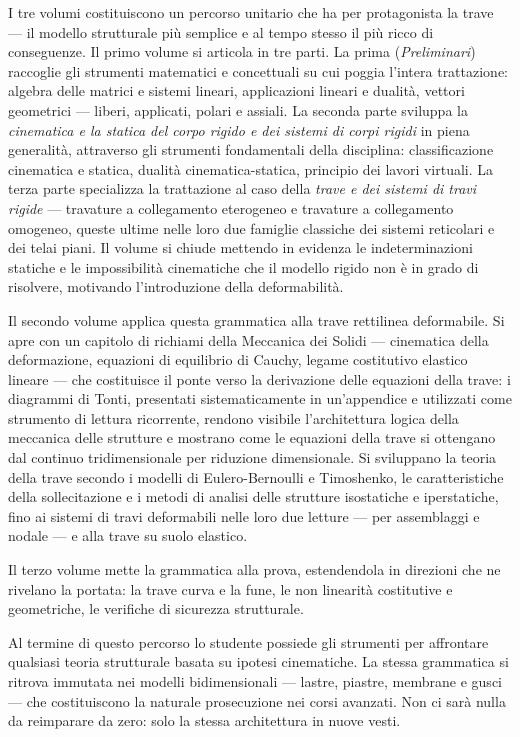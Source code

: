 I tre volumi costituiscono un percorso unitario che ha per
protagonista la trave --- il modello strutturale più
semplice e al tempo stesso il più ricco di conseguenze. Il
primo volume si articola in tre parti. La prima
(\emph{Preliminari}) raccoglie gli strumenti matematici e
concettuali su cui poggia l'intera trattazione: algebra
delle matrici e sistemi lineari, applicazioni lineari e
dualità, vettori geometrici --- liberi, applicati, polari e
assiali. La seconda parte sviluppa la \emph{cinematica e la
	statica del corpo rigido e dei sistemi di corpi rigidi} in
piena generalità, attraverso gli strumenti fondamentali
della disciplina: classificazione cinematica e statica,
dualità cinematica-statica, principio dei lavori virtuali.
La terza parte specializza la trattazione al caso della
\emph{trave e dei sistemi di travi rigide} --- travature a
collegamento eterogeneo e travature a collegamento omogeneo,
queste ultime nelle loro due famiglie classiche dei sistemi
reticolari e dei telai piani. Il volume si chiude mettendo
in evidenza le indeterminazioni statiche e le impossibilità
cinematiche che il modello rigido non è in grado di
risolvere, motivando l'introduzione della deformabilità.

Il secondo volume applica questa grammatica alla trave
rettilinea deformabile. Si apre con un capitolo di richiami
della Meccanica dei Solidi --- cinematica della deformazione,
equazioni di equilibrio di Cauchy, legame costitutivo
elastico lineare --- che costituisce il ponte verso la
derivazione delle equazioni della trave: i diagrammi di
Tonti, presentati sistematicamente in un'appendice e
utilizzati come strumento di lettura ricorrente, rendono
visibile l'architettura logica della meccanica delle strutture
e mostrano come le equazioni della trave si ottengano dal
continuo tridimensionale per riduzione dimensionale. Si
sviluppano la teoria della trave secondo i modelli di
Eulero-Bernoulli e Timoshenko, le caratteristiche della
sollecitazione e i metodi di analisi delle strutture
isostatiche e iperstatiche, fino ai sistemi di travi
deformabili nelle loro due letture --- per assemblaggi e
nodale --- e alla trave su suolo elastico.

Il terzo volume mette la grammatica alla prova, estendendola
in direzioni che ne rivelano la portata: la trave curva e la
fune, le non linearità costitutive e geometriche, le
verifiche di sicurezza strutturale.



Al termine di questo percorso lo studente possiede gli strumenti per affrontare qualsiasi teoria strutturale basata su ipotesi cinematiche. La stessa grammatica si ritrova immutata nei modelli bidimensionali --- lastre, piastre, membrane e gusci --- che costituiscono la naturale prosecuzione nei corsi avanzati. Non ci sarà nulla da reimparare da zero: solo la stessa architettura in nuove vesti.

